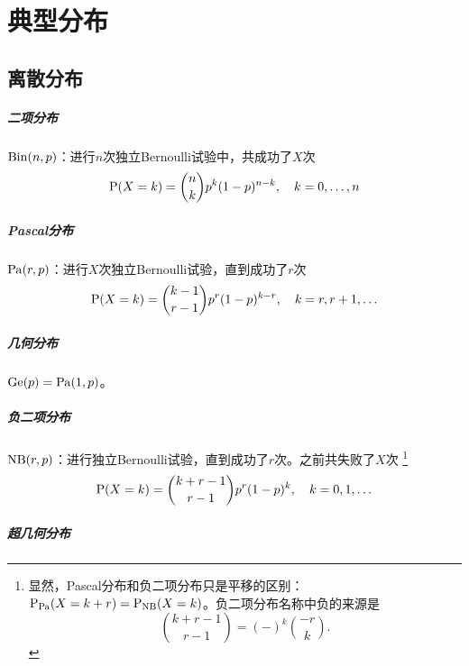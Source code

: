\chapter{典型分布}

\section{离散分布}

\paragraph{二项分布}

$\BinDist(n,p)$：进行$n$次独立Bernoulli试验中，共成功了$X$次
\begin{equation}
	\P(X = k) = \binom nk p^k(1 - p)^{n-k},\quad k = 0,\ldots,n
\end{equation}

\paragraph{Pascal分布}

$\PascalDist(r,p)$：进行$X$次独立Bernoulli试验，直到成功了$r$次
\begin{equation}
	\P(X = k) = \binom{k - 1}{r - 1}p^r(1 - p)^{k-r},\quad k = r,r + 1,\ldots
\end{equation}

\paragraph{几何分布}

$\GeomDist(p) = \PascalDist(1,p)$。

\paragraph{负二项分布}

$\NegBinDist(r,p)$：进行独立Bernoulli试验，直到成功了$r$次。之前共失败了$X$次
\footnote{
	显然，Pascal分布和负二项分布只是平移的区别：$\P_{\PascalDist}(X = k + r) = \P_{\NegBinDist}(X = k)$。负二项分布名称中负的来源是
	\begin{equation}
		\binom{k + r - 1}{r - 1} = (-)^k\binom{-r}{k}.
	\end{equation}
}
\begin{equation}
	\P(X = k) = \binom{k + r - 1}{r - 1}p^r(1 - p)^k,\quad k = 0,1,\ldots
\end{equation}

\paragraph{超几何分布}

